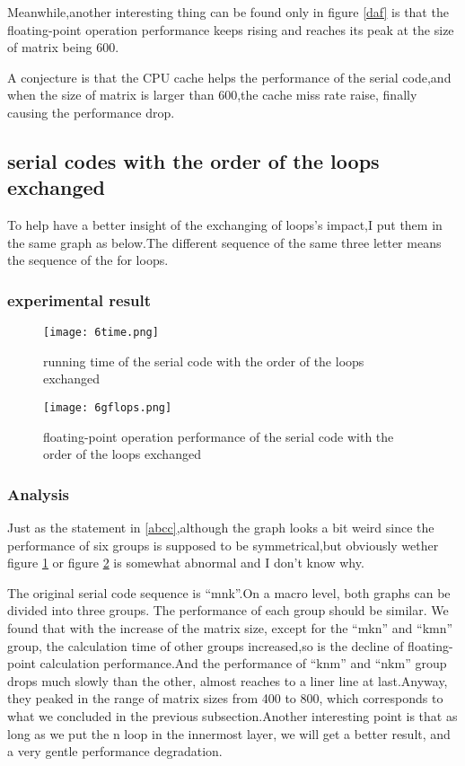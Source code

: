 \documentclass[11pt]{scrartcl} %
\begin{document}
	Meanwhile,another interesting thing can be found only in figure \ref{daf} is that the floating-point operation performance keeps rising and reaches its peak at the size of matrix being 600.

	A conjecture is that the CPU cache helps the performance of the serial code,and when the size of matrix is larger than 600,the cache miss rate raise, finally causing the performance drop.
\subsection{serial codes with the order of the loops exchanged}
	To help have a better insight of the exchanging of loops's impact,I put them in the same graph as below.The different sequence of the same three letter means the sequence of the for loops.
	\subsubsection{experimental result}
		\begin{figure}[H]
			\centering
			\texttt{[image: 6time.png]}
			\caption{running time of the serial code with the order of the loops exchanged}
			\label{sb1}
		\end{figure}
		\begin{figure}[H]
			\centering
			\texttt{[image: 6gflops.png]}
			\caption{floating-point operation performance of the serial code with the order of the loops exchanged}
			\label{sb2}
		\end{figure}
		\subsubsection{Analysis}
		Just as the statement in \ref{abcc},although the graph looks a bit weird since the performance of six groups is supposed to be symmetrical,but obviously wether  figure \ref{sb1} or figure \ref{sb2} is somewhat abnormal and I don't know why.

		The original serial code sequence is ``mnk''.On a macro level, both graphs can be divided into three groups. The performance of each group should be similar. We found that with the increase of the matrix size, except for the ``mkn'' and ``kmn'' group, the calculation time of other groups increased,so is the decline of floating-point calculation performance.And the performance of  ``knm'' and ``nkm'' group drops much slowly than the other, almost reaches to a liner line at last.Anyway, they peaked in the range of matrix sizes from 400 to 800, which corresponds to what we concluded in the previous subsection.Another interesting point is that as long as we put the n loop in the innermost layer, we will get a better result, and a very gentle performance degradation.
\end{document}
